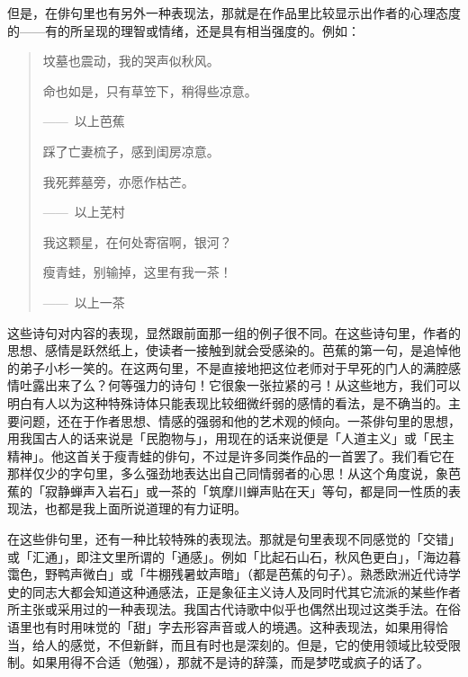 {    但是，在俳句里也有另外一种表现法，那就是在作品里比较显示出作者的心理态度的——有的所呈现的理智或情绪，还是具有相当强度的。例如：
    \begin{quote}
        坟墓也震动，我的哭声似秋风。

        命也如是，只有草笠下，稍得些凉意。

        \hfill ——~以上芭蕉

        踩了亡妻梳子，感到闺房凉意。

        我死葬墓旁，亦愿作枯芒。

        \hfill ——~以上芜村

        我这颗星，在何处寄宿啊，银河？

        瘦青蛙，别输掉，这里有我一茶！

        \hfill ——~以上一茶
    \end{quote}

    这些诗句对内容的表现，显然跟前面那一组的例子很不同。在这些诗句里，作者的思想、感情是跃然纸上，使读者一接触到就会受感染的。芭蕉的第一句，是追悼他的弟子小杉一笑的。在这两句里，不是直接地把这位老师对于早死的门人的满腔感情吐露出来了么？何等强力的诗句！它很象一张拉紧的弓！从这些地方，我们可以明白有人以为这种特殊诗体只能表现比较细微纤弱的感情的看法，是不确当的。主要问题，还在于作者思想、情感的强弱和他的艺术观的倾向。一茶俳句里的思想，用我国古人的话来说是「民胞物与」，用现在的话来说便是「人道主义」或「民主精神」。他这首关于瘦青蛙的俳句，不过是许多同类作品的一首罢了。我们看它在那样仅少的字句里，多么强劲地表达出自己同情弱者的心思！从这个角度说，象芭蕉的「寂静蝉声入岩石」或一茶的「筑摩川蝉声贴在天」等句，都是同一性质的表现法，也都是我上面所说道理的有力证明。

    在这些俳句里，还有一种比较特殊的表现法。那就是句里表现不同感觉的「交错」或「汇通」，即注文里所谓的「通感」。例如「比起石山石，秋风色更白」，「海边暮霭色，野鸭声微白」或「牛棚残暑蚊声暗」（都是芭蕉的句子）。熟悉欧洲近代诗学史的同志大都会知道这种通感法，正是象征主义诗人及同时代其它流派的某些作者所主张或采用过的一种表现法。我国古代诗歌中似乎也偶然出现过这类手法。在俗语里也有时用味觉的「甜」字去形容声音或人的境遇。这种表现法，如果用得恰当，给人的感觉，不但新鲜，而且有时也是深刻的。但是，它的使用领域比较受限制。如果用得不合适（勉强），那就不是诗的辞藻，而是梦呓或疯子的话了。

}

